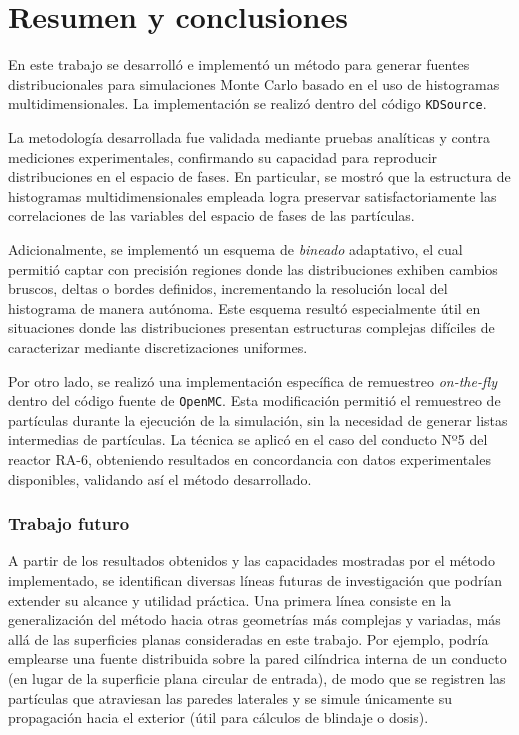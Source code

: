 \chapter{Resumen y conclusiones}
\label{chap:conclusiones}

En este trabajo se desarrolló e implementó un método para generar fuentes distribucionales para simulaciones Monte Carlo basado en el uso de histogramas multidimensionales. La implementación se realizó dentro del código \texttt{KDSource}.

La metodología desarrollada fue validada mediante pruebas analíticas y contra mediciones experimentales, confirmando su capacidad para reproducir distribuciones en el espacio de fases. En particular, se mostró que la estructura de histogramas multidimensionales empleada logra preservar satisfactoriamente las correlaciones de las variables del espacio de fases de las partículas.

Adicionalmente, se implementó un esquema de \textit{bineado} adaptativo, el cual permitió captar con precisión regiones donde las distribuciones exhiben cambios bruscos, deltas o bordes definidos, incrementando la resolución local del histograma de manera autónoma. Este esquema resultó especialmente útil en situaciones donde las distribuciones presentan estructuras complejas difíciles de caracterizar mediante discretizaciones uniformes.

Por otro lado, se realizó una implementación específica de remuestreo \textit{on-the-fly} dentro del código fuente de \texttt{OpenMC}. Esta modificación permitió el remuestreo de partículas durante la ejecución de la simulación, sin la necesidad de generar listas intermedias de partículas. La técnica se aplicó en el caso del conducto Nº5 del reactor RA-6, obteniendo resultados en concordancia con datos experimentales disponibles, validando así el método desarrollado.

\subsection*{Trabajo futuro}

A partir de los resultados obtenidos y las capacidades mostradas por el método implementado, se identifican diversas líneas futuras de investigación que podrían extender su alcance y utilidad práctica. Una primera línea consiste en la generalización del método hacia otras geometrías más complejas y variadas, más allá de las superficies planas consideradas en este trabajo. Por ejemplo, podría emplearse una fuente distribuida sobre la pared cilíndrica interna de un conducto (en lugar de la superficie plana circular de entrada), de modo que se registren las partículas que atraviesan las paredes laterales y se simule únicamente su propagación hacia el exterior (útil para cálculos de blindaje o dosis).

